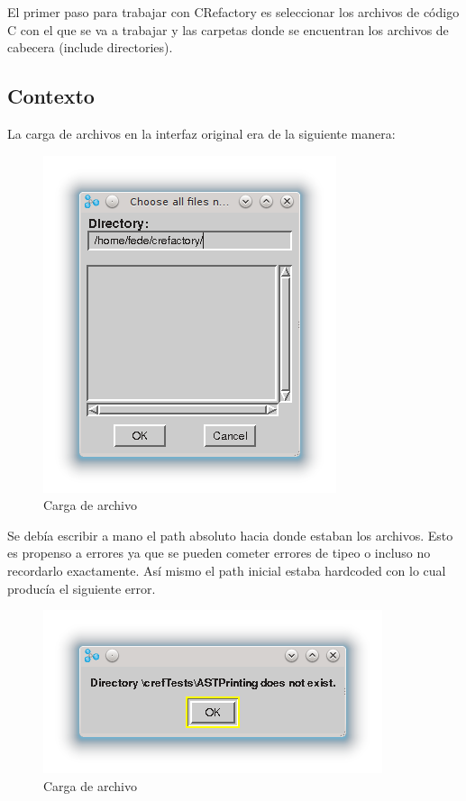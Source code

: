 \documentclass[a4paper,oneside,10pt]{article}
\begin{document}
El primer paso para trabajar con CRefactory es seleccionar los archivos de c\'odigo C con el que se va a trabajar y las carpetas donde se encuentran los archivos de cabecera (include directories).

\subsection{Contexto}
La carga de archivos en la interfaz original era de la siguiente manera:

\begin{figure}[h!]
  \centering
    \includegraphics[scale=0.85]{images/codigo_original/carga.png}
    \caption{Carga de archivo}
\end{figure}

Se deb\'ia escribir a mano el path absoluto hacia donde estaban los archivos. Esto es propenso a errores ya que se pueden cometer errores de tipeo o incluso no recordarlo exactamente.
As\'i mismo el path inicial estaba hardcoded con lo cual producía el siguiente error.

\begin{figure}[h!]
  \centering
    \includegraphics[scale=0.85]{images/codigo_original/error.png}
    \caption{Carga de archivo}
\end{figure}
\end{document}
